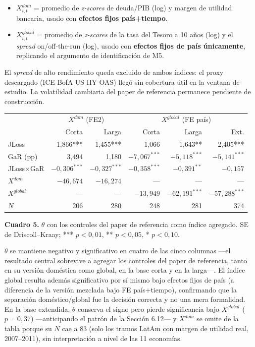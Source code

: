 \documentclass[5p,times,twocolumn,authoryear]{elsarticle}
\begin{document}
\begin{itemize}
    \item $X^{dom}_{i,t}$ = promedio de \textit{z-scores} de deuda/PIB (log) y margen de utilidad bancaria, usado con \textbf{efectos fijos país+tiempo}.
    \item $X^{global}_{i,t}$ = promedio de \textit{z-scores} de la tasa del Tesoro a 10 años (log) y el \textit{spread} on/off-the-run (log), usado con \textbf{efectos fijos de país únicamente}, replicando el argumento de identificación de M5.
\end{itemize}

El \textit{spread} de alto rendimiento queda excluido de ambos índices: el proxy descargado (ICE BofA US HY OAS) llegó sin cobertura útil en la ventana de estudio. La volatilidad cambiaria del paper de referencia permanece pendiente de construcción.

\begin{table}[t]
\centering
\small
\begin{tabular}{lrrrrr}
\toprule
 & \multicolumn{2}{c}{$X^{dom}$ (FE2)} & \multicolumn{3}{c}{$X^{global}$ (FE país)} \\
 & Corta & Larga & Corta & Larga & Ext. \\
\midrule
JLoss & 1,866*** & 1,455*** & 1,066 & 1,643** & 2,405*** \\
GaR (pp) & 3,494 & 1,180 & $-7,067^{***}$ & $-5,118^{***}$ & $-5,141^{***}$ \\
JLoss$\times$GaR & $-0,306^{***}$ & $-0,327^{***}$ & $-0,358^{***}$ & $-0,391^{**}$ & $-0,157$ \\
$X^{dom}$ & $-46,674$ & $-16,274$ & — & — & — \\
$X^{global}$ & — & — & $-13,949$ & $-62,191^{***}$ & $-57,288^{***}$ \\
$N$ & 206 & 280 & 248 & 281 & 374 \\
\bottomrule
\end{tabular}
\smallskip
\small\textbf{Cuadro 5.} $\theta$ con los controles del paper de referencia como índice agregado. SE de Driscoll–Kraay; *** $p<0{,}01$, ** $p<0{,}05$, * $p<0{,}10$.
\end{table}

$\theta$ se mantiene negativo y significativo en cuatro de las cinco columnas —el resultado central sobrevive a agregar los controles del paper de referencia, tanto en su versión doméstica como global, en la base corta y en la larga—. El índice global resulta además significativo por sí mismo bajo efectos fijos de país (a diferencia de la versión mezclada bajo FE país+tiempo), confirmando que la separación doméstico/global fue la decisión correcta y no una mera formalidad. En la base extendida, $\theta$ conserva el signo pero pierde significancia bajo $X^{global}$ ($p=0{,}37$) —anticipando el patrón de la Sección 6.12— y $X^{dom}$ se omite de la tabla porque su $N$ cae a 83 (solo los tramos LatAm con margen de utilidad real, 2007–2011), sin interpretación a nivel de las 11 economías.
\end{document}
